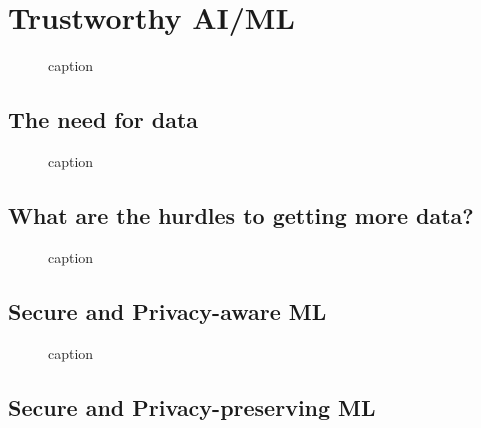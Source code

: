 \documentclass[11pt]{article}
\begin{document}


\tableofcontents

\clearpage

\section{Trustworthy AI/ML}

\begin{figure}[H]
    \centering
    \caption{caption}
\end{figure}

\subsection{The need for data}

\begin{figure}[H]
    \centering
    \caption{caption}
\end{figure}

\subsection{What are the hurdles to getting more data?}

\begin{figure}[H]
    \centering
    \caption{caption}
\end{figure}

\subsection{Secure and Privacy-aware ML}

\begin{figure}[H]
    \centering
    \caption{caption}
\end{figure}

\subsection{Secure and Privacy-preserving ML}
\end{document}
